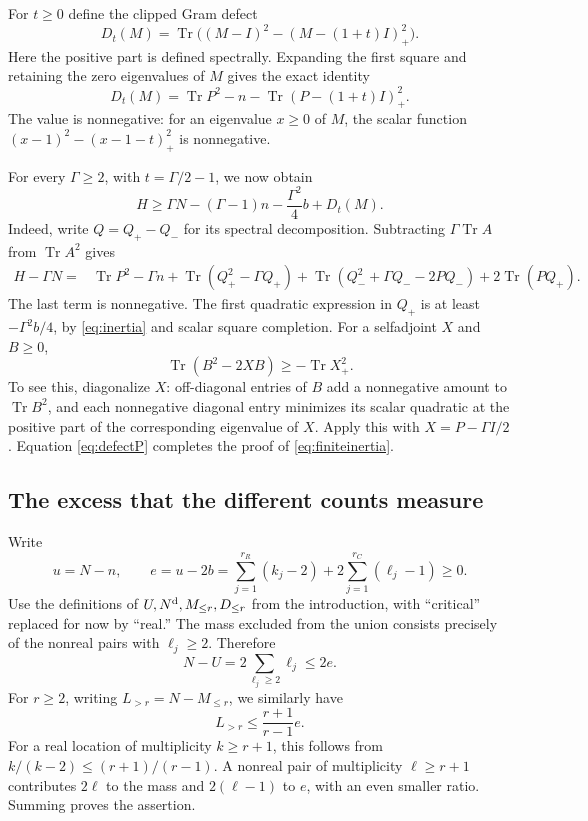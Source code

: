 \documentclass[11pt]{amsart}
\numberwithin{equation}{section}
\newcommand{\Tr}{\operatorname{Tr}}
\newcommand{\Nd}{N^{\rm d}}
\begin{document}
For $t\ge0$ define the clipped Gram defect
\begin{equation}
 D_t(M)=\Tr\bigl((M-I)^2-(M-(1+t)I)_+^2\bigr).
 \label{eq:defect}
\end{equation}
Here the positive part is defined spectrally. Expanding the first square
and retaining the zero eigenvalues of $M$ gives the exact identity
\begin{equation}
 D_t(M)=\Tr P^2-n-\Tr(P-(1+t)I)_+^2.\label{eq:defectP}
\end{equation}
The value is nonnegative: for an eigenvalue $x\ge0$ of $M$, the scalar
function $(x-1)^2-(x-1-t)_+^2$ is nonnegative.

For every $\Gamma\ge2$, with $t=\Gamma/2-1$, we now obtain
\begin{equation}
 H\ge\Gamma N-(\Gamma-1)n-\frac{\Gamma^2}{4}b+D_t(M).
 \label{eq:finiteinertia}
\end{equation}
Indeed, write $Q=Q_+-Q_-$ for its spectral decomposition. Subtracting
$\Gamma\Tr A$ from $\Tr A^2$ gives
\begin{align*}
 H-\Gamma N={}&\Tr P^2-\Gamma n
 +\Tr(Q_+^2-\Gamma Q_+)
 +\Tr(Q_-^2+\Gamma Q_--2PQ_-)
 +2\Tr(PQ_+).
\end{align*}
The last term is nonnegative. The first quadratic expression in $Q_+$
is at least $-\Gamma^2 b/4$, by \eqref{eq:inertia} and scalar square
completion. For a selfadjoint $X$ and $B\ge0$,
\begin{equation}
 \Tr(B^2-2XB)\ge-\Tr X_+^2.\label{eq:positivecompletion}
\end{equation}
To see this, diagonalize $X$: off-diagonal entries of $B$ add a
nonnegative amount to $\Tr B^2$, and each nonnegative diagonal entry
minimizes its scalar quadratic at the positive part of the corresponding
eigenvalue of $X$. Apply this with $X=P-\Gamma I/2$. Equation
\eqref{eq:defectP} completes the proof of \eqref{eq:finiteinertia}.

\subsection{The excess that the different counts measure}

Write
\begin{equation}
 u=N-n,\qquad e=u-2b
 =\sum_{j=1}^{r_R}(k_j-2)+2\sum_{j=1}^{r_C}(\ell_j-1)\ge0.
 \label{eq:excess}
\end{equation}
Use the definitions of $U,\Nd,M_{\le r},D_{\le r}$ from the
introduction, with ``critical'' replaced for now by ``real.'' The mass
excluded from the union consists precisely of the nonreal pairs with
$\ell_j\ge2$. Therefore
\begin{equation}
 N-U=2\sum_{\ell_j\ge2}\ell_j\le2e.\label{eq:unionexcess}
\end{equation}
For $r\ge2$, writing $L_{>r}=N-M_{\le r}$, we similarly have
\begin{equation}
 L_{>r}\le\frac{r+1}{r-1}e.\label{eq:massexcess}
\end{equation}
For a real location of multiplicity $k\ge r+1$, this follows from
$k/(k-2)\le(r+1)/(r-1)$. A nonreal pair of multiplicity
$\ell\ge r+1$ contributes $2\ell$ to the mass and $2(\ell-1)$ to
$e$, with an even smaller ratio. Summing proves the assertion.
\end{document}
